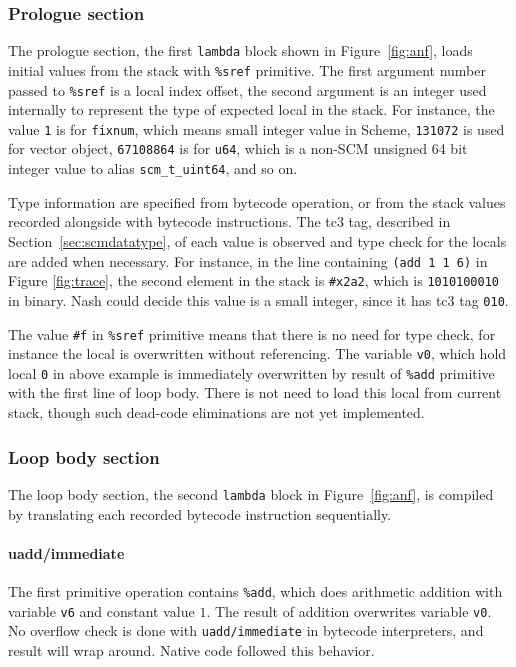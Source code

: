 \documentclass[preprint, 10pt]{sigplanconf}
\begin{document}
\subsubsection{Prologue section}
\label{sec:irprologue}

The prologue section, the first \texttt{lambda} block shown in
Figure~\hyperref[fig:anf]{\ref{fig:anf}}, loads initial values from the stack
with \texttt{\%sref} primitive. The first argument number passed to
\texttt{\%sref} is a local index offset, the second argument is an integer
used internally to represent the type of expected local in the stack. For
instance, the value \texttt{1} is for \texttt{fixnum}, which means small
integer value in Scheme, \texttt{131072} is used for vector object,
\texttt{67108864} is for \texttt{u64}, which is a non-SCM unsigned 64 bit
integer value to alias \texttt{scm\_t\_uint64}, and so on.

Type information are specified from bytecode operation, or from the stack
values recorded alongside with bytecode instructions. The tc3 tag, described
in Section~\ref{sec:scmdatatype}, of each value is observed and type check for
the locals are added when necessary. For instance, in the line containing
\texttt{(add~1~1~6)} in Figure \hyperref[fig:trace]{\ref{fig:trace}}, the
second element in the stack is \texttt{\#x2a2}, which is \texttt{1010100010}
in binary. Nash could decide this value is a small integer, since it has tc3
tag \texttt{010}.

The value \texttt{\#f} in \texttt{\%sref} primitive means that there is no
need for type check, for instance the local is overwritten without
referencing. The variable \texttt{v0}, which hold local \texttt{0} in above
example is immediately overwritten by result of \texttt{\%add} primitive with
the first line of loop body. There is not need to load this local from current
stack, though such dead-code eliminations are not yet implemented.

\subsubsection{Loop body section}

The loop body section, the second \texttt{lambda} block in
Figure~\hyperref[fig:anf]{\ref{fig:anf}}, is compiled by translating each
recorded bytecode instruction sequentially.

\paragraph{uadd/immediate} The first primitive operation contains
\texttt{\%add}, which does arithmetic addition with variable \texttt{v6} and
constant value $1$. The result of addition overwrites variable \texttt{v0}. No
overflow check is done with \texttt{uadd/immediate} in bytecode interpreters,
and result will wrap around. Native code followed this behavior.
\end{document}

